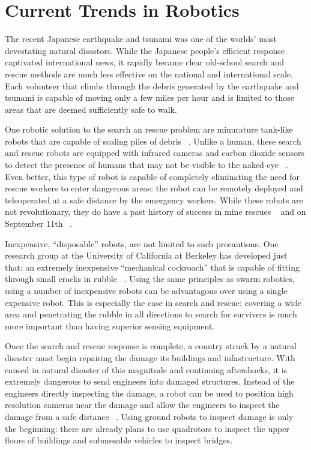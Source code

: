\documentclass[11pt,twocolumn]{article}
\begin{document}
\section{Current Trends in Robotics}
\label{sec:econ}
The recent Japanese earthquake and tsunami was one of the worlds' most
devestating natural disastors. While the Japanese people's efficient response
captivated international news, it rapidly became clear old-school search and
rescue methods are much less effective on the national and international scale.
Each volunteer that climbs through the debris generated by the earthquake and
tsunami is capable of moving only a few miles per hour and is limited to those
areas that are deemed sufficiently safe to walk.

One robotic solution to the search an rescue problem are minurature tank-like
robots that are capable of scaling piles of debris ~\cite{search}. Unlike a
human, these search and rescue robots are equipped with infrared cameras and
carbon dioxide sensors to detect the presence of humans that may not be visible
to the naked eye ~\cite{search}. Even better, this type of robot is capable of
completely eliminating the need for rescue workers to enter dangerous areas:
the robot can be remotely deployed and teleoperated at a safe distance by the
emergency workers. While these robots are not revolutionary, they do have a
past history of success in mine rescues ~\cite{mine} and on September 11th
~\cite{sept11}.

Inexpensive, ``disposable'' robots, are not limited to such precautions. One
research group at the University of California at Berkeley has developed just
that: an extremely inexpensive ``mechanical cockroach'' that is capable of
fitting through small cracks in rubble ~\cite{cockroach}. Using the same
principles as swarm robotics, using a number of inexpensive robots can be
advantagous over using a single expensive robot. This is especially the case in
search and rescue: covering a wide area and penetrating the rubble in all
directions to search for survivers is much more important than having superior
sensing equipment.

Once the search and rescue response is complete, a country struck by a natural
disaster must begin repairing the damage its buildings and infastructure. With
caused in natural disaster of this magnitude and continuing aftershocks, it is
extremely dangerous to send engineers into damaged structures. Instead of the
engineers directly inspecting the damage, a robot can be used to position high
resolution cameras near the damage and allow the engineers to inspect the
damage from a safe distance ~\cite{gym}. Using ground robots to inspect damage
is only the beginning: there are already plans to use quadrotors to inspect
the upper floors of buildings and submesable vehicles to inspect bridges.
\end{document}
